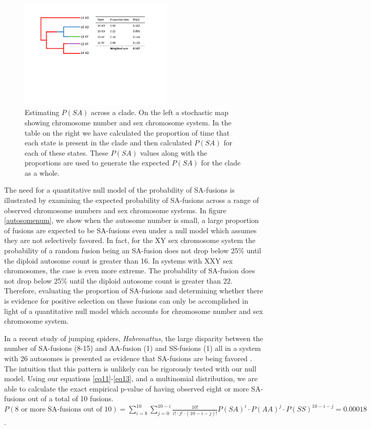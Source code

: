 \documentclass[12pt]{article}
\begin{document}
\begin{figure} 
\includegraphics[width=0.65\textwidth]{approach.pdf}
\centering
\caption{Estimating $P(SA)$ across a clade. On the left a stochastic map showing chromosome number and sex chromosome system. In the table on the right we have calculated the proportion of time that each state is present in the clade and then calculated $P(SA)$ for each of these states. These $P(SA)$ values along with the proportions are used to generate the expected $P(SA)$ for the clade as a whole.}
\label{approach}
\end{figure}

The need for a quantitative null model of the probability of SA-fusions is illustrated by examining the expected probability of SA-fusions across a range of observed chromosome numbers and sex chromosome systems.
In figure \ref{autosomenum}, we show when the autosome number is small, a large proportion of fusions are expected to be SA-fusions even under a null model which assumes they are not selectively favored. 
In fact, for the XY sex chromosome system the probability of a random fusion being an SA-fusion does not drop below 25\% until the diploid autosome count is greater than 16. 
In systems with XXY sex chromosomes, the case is even more extreme. The probability of SA-fusion does not drop below 25\% until the diploid autosome count is greater than 22.
Therefore, evaluating the proportion of SA-fusions and determining whether there is evidence for positive selection on these fusions can only be accomplished in light of a quantitative null model which accounts for chromosome number and sex chromosome system.

In a recent study of jumping spiders, \textit{Habronattus}, the large disparity between the number of SA-fusions (8-15) and AA-fusion (1) and SS-fusions (1) all in a system with 26 autosomes is presented as evidence that SA-fusions are being favored \citep{maddison2013}. 
The intuition that this pattern is unlikely can be rigorously tested with our null model.
Using our equations \ref{eq11}-\ref{eq13}, and a multinomial distribution, we are able to calculate the exact empirical p-value of having observed eight or more SA-fusions out of a total of 10 fusions. 
$P(8 \mbox{ or more SA-fusions out of } 10)= 
\sum\limits_{i=8}^{10} \sum\limits_{j=0}^{10-i} \frac{10!}{i! \cdot j! \cdot (10-i-j)!} P(SA)^i \cdot P(AA)^j \cdot P(SS)^{10-i-j} = 0.00018$. 
\end{document}
